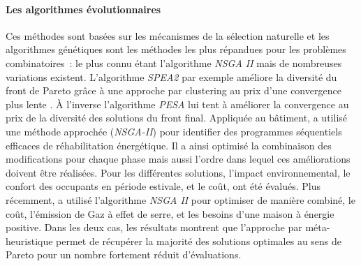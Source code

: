 \paragraph{Les algorithmes évolutionnaires} %
\label{par:les_algorithmes_evolutionnaires}
%
%
Ces méthodes sont basées sur les mécanismes de la sélection naturelle et les algorithmes
génétiques sont les méthodes les plus répandues pour les problèmes combinatoires~:
le plus connu étant l’algorithme \textit{NSGA II}
\parencite{Deb2002182} mais de nombreuses variations existent. L’algorithme
\textit{SPEA2} par exemple améliore la diversité du front de Pareto grâce à une approche
par clustering au prix d’une convergence plus lente \parencite{Zitzler2001}. À
l’inverse l’algorithme \textit{PESA} lui tent à améliorer la convergence au prix
de la diversité des solutions du front final. Appliquée au bâtiment,
\textcite{Rivallain2013} a utilisé une méthode approchée (\textit{NSGA-II}) pour identifier
des programmes séquentiels efficaces de réhabilitation énergétique. Il a ainsi
optimisé la combinaison des modifications pour chaque phase mais aussi l’ordre
dans lequel ces améliorations doivent être réalisées. Pour les différentes
solutions, l’impact environnemental, le confort des occupants en période
estivale, et le coût, ont été évalués. Plus récemment, \textcite{Recht2016} a
utilisé l’algorithme \textit{NSGA II} pour optimiser de manière combiné, le coût,
l’émission de Gaz à effet de serre, et les besoins d’une maison à énergie
positive. Dans les deux cas, les résultats montrent que l’approche par méta-
heuristique permet de récupérer la majorité des solutions optimales au sens de Pareto pour
un nombre fortement réduit d’évaluations.


